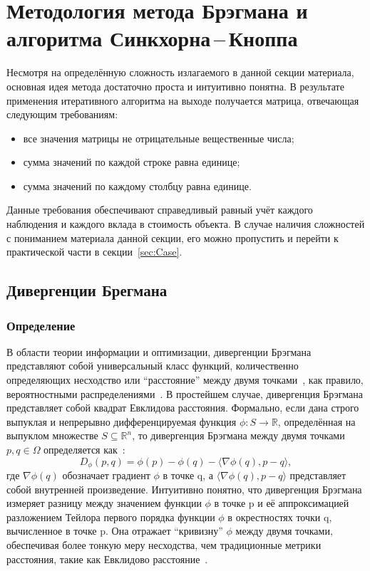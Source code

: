 \documentclass[12pt]{scrartcl}
\begin{document}
\section{Методология метода Брэгмана и алгоритма Синкхорна\,--\,Кноппа}\label{sec:Methodology}
Несмотря на определённую сложность излагаемого в данной секции материала, основная идея метода достаточно проста и интуитивно понятна. В результате применения итеративного алгоритма на выходе получается матрица, отвечающая следующим требованиям:
\begin{itemize}
    \item все значения матрицы не отрицательные вещественные числа;
    \item сумма значений по каждой строке равна единице;
    \item сумма значений по каждому столбцу равна единице.
\end{itemize}
Данные требования обеспечивают справедливый равный учёт каждого наблюдения и каждого вклада в стоимость объекта. В случае наличия сложностей с пониманием материала данной секции, его можно пропустить и перейти к практической части в секции~\ref{sec:Case}.

\subsection{Дивергенции Брегмана}\label{subsec:Divergentions}
\subsubsection{Определение}\label{subsubsec:Definition}
В области теории информации и оптимизации, дивергенции Брэгмана представляют собой универсальный класс функций, количественно определяющих несходство или ``расстояние'' между двумя точками~\cite{Nielsen2009}, как правило, вероятностными распределениями~\cite{Nock2012}. В простейшем случае, дивергенция Брэгмана представляет собой квадрат Евклидова расстояния. Формально, если дана строго выпуклая и непрерывно дифференцируемая функция $\phi: S \rightarrow \mathbb{R} $, определённая на выпуклом множестве $S \subseteq \mathbb{R}^n$, то дивергенция Брэгмана между двумя точками $p, q \in \Omega$ определяется как~\cite{Amid2019}:
\begin{equation}
    D_{\phi}(p, q) = \phi(p) - \phi(q) - \langle \nabla \phi(q), p - q \rangle,
\end{equation}
где $\nabla \phi(q)$ обозначает градиент $\phi$ в точке q, а $\langle \nabla \phi(q), p - q \rangle$ представляет собой внутренней произведение. Интуитивно понятно, что дивергенция Брэгмана измеряет разницу между значением функции $\phi$ в точке p и её аппроксимацией разложением Тейлора первого порядка функции $\phi$ в окрестностях точки q, вычисленное в точке p. Она отражает ``кривизну'' $\phi$ между двумя точками, обеспечивая более тонкую меру несходства, чем традиционные метрики расстояния, такие как Евклидово расстояние~\cite{Dhillon_2008}.
\end{document}
